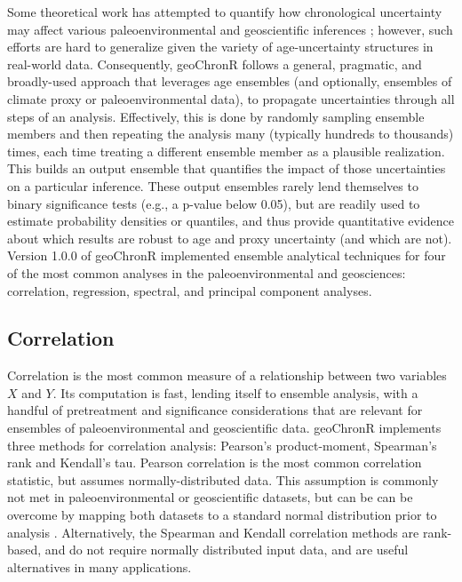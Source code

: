 \documentclass[gchron, manuscript]{copernicus}
\begin{document}
Some theoretical work has attempted to quantify how chronological uncertainty may affect various paleoenvironmental and geoscientific inferences \citep[e.g.][]{HuybersWunsch2004}; however, such efforts are hard to generalize given the variety of age-uncertainty structures in real-world data.
Consequently, geoChronR follows a general, pragmatic, and broadly-used approach that leverages age ensembles (and optionally, ensembles of climate proxy or paleoenvironmental data), to propagate uncertainties through all steps of an analysis.
Effectively, this is done by randomly sampling ensemble members and then repeating the analysis many (typically hundreds to thousands) times, each time treating a different ensemble member as a plausible realization. This builds an output ensemble that quantifies the impact of those uncertainties on a particular inference.
These output ensembles rarely lend themselves to binary significance tests (e.g., a p-value below 0.05), but are readily used to estimate probability densities or quantiles, and thus provide quantitative evidence about which results are robust to age and proxy uncertainty (and which are not).
Version 1.0.0 of geoChronR implemented ensemble analytical techniques for four of the most common analyses in the paleoenvironmental and geosciences: correlation, regression, spectral, and principal component analyses.

\hypertarget{sec:correlation}{%
\subsection{Correlation}\label{sec:correlation}}

Correlation is the most common measure of a relationship between two variables \(X\) and \(Y\).
Its computation is fast, lending itself to ensemble analysis, with a handful of pretreatment and significance considerations that are relevant for ensembles of paleoenvironmental and geoscientific data.
geoChronR implements three methods for correlation analysis: Pearson's product-moment, Spearman's rank and Kendall's tau.
Pearson correlation is the most common correlation statistic, but assumes normally-distributed data.
This assumption is commonly not met in paleoenvironmental or geoscientific datasets, but can be can be overcome by mapping both datasets to a standard normal distribution prior to analysis \citep[\citet{JEG_Tingley_CP2016}]{vanAlbada2007}.
Alternatively, the Spearman and Kendall correlation methods are rank-based, and do not require normally distributed input data, and are useful alternatives in many applications.
\end{document}
